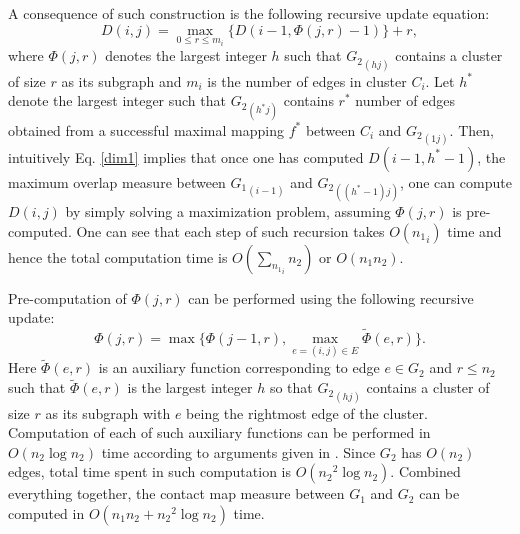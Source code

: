 A consequence of such construction is the following recursive update equation:
\begin{equation}
\label{dim1}
D(i,j) = \max_{0\le r\le m_{i}}\{D(i-1,\Phi(j,r)-1)\} + r,
\end{equation}
where $\Phi(j,r)$ denotes the largest integer $h$ such that ${G_2}_{(hj)}$ contains a cluster of size $r$ as its
subgraph and $m_{i}$ is the number of edges in cluster $C_{i}$.
Let $h^{*}$ denote the largest integer such that ${G_2}_{({h^{*}j})}$ contains $r^{*}$ number of edges obtained from a successful maximal mapping $f^{*}$ between $C_{i}$ and ${G_2}_{({1j})}$. Then, intuitively Eq. \ref{dim1} implies that once one has computed $D(i-1,h^{*}-1)$, the maximum overlap measure between ${G_1}_{(i-1)}$ and ${G_2}_{({(h^{*}-1)j})}$, one can compute $D(i,j)$ by simply solving a maximization problem, assuming $\Phi(j,r)$ is pre-computed. One can see that each step of such recursion takes $O({n_1}_{i})$ time and hence the total computation time is $O(\sum_{{n_1}_{i}}n_2)$ or $O({n_1}{n_2})$.

Pre-computation of $\Phi(j,r)$ can be performed using the following recursive update:
\begin{equation}
\label{rec2}
\Phi(j,r) = \max\{\Phi(j-1,r), \max_{e=(i,j)\in E}\tilde{\Phi}(e,r)\}.
\end{equation}
Here $\tilde{\Phi}(e,r)$ is an auxiliary function corresponding to edge $e\in G_2$ and $r\le {n_2}$ such that $\tilde{\Phi}(e,r)$ is the largest integer $h$ so that ${G_2}_({hj})$ contains a cluster of size $r$ as
its subgraph with $e$ being the rightmost edge of the cluster. Computation of each of such auxiliary functions can be performed in $O({n_2}\log {n_2})$ time according to arguments given in \citet{k73}. Since $G_2$ has $O(n_2)$ edges, total time spent in such computation is $O({n_2}^{2}\log {n_2})$. Combined everything together, the contact map measure between
$G_1$ and $G_2$ can be computed in $O({n_1}{n_2}+{n_2}^{2}\log {n_2})$ time.
